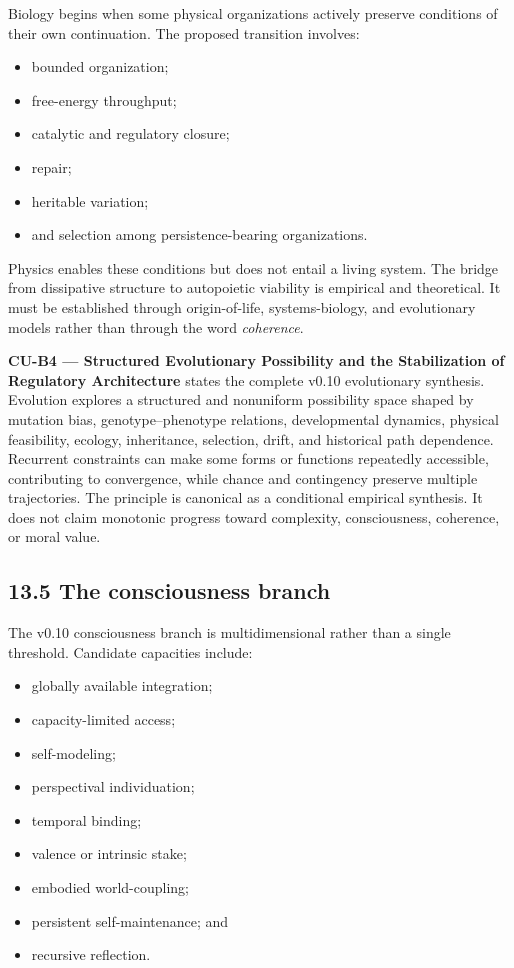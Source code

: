 \documentclass[
  11pt,
]{article}
\providecommand{\tightlist}{%
  \setlength{\itemsep}{0pt}\setlength{\parskip}{0pt}}
\begin{document}
Biology begins when some physical organizations actively preserve
conditions of their own continuation. The proposed transition involves:

\begin{itemize}
\tightlist
\item
  bounded organization;
\item
  free-energy throughput;
\item
  catalytic and regulatory closure;
\item
  repair;
\item
  heritable variation;
\item
  and selection among persistence-bearing organizations.
\end{itemize}

Physics enables these conditions but does not entail a living system.
The bridge from dissipative structure to autopoietic viability is
empirical and theoretical. It must be established through
origin-of-life, systems-biology, and evolutionary models rather than
through the word \emph{coherence}.

\textbf{CU-B4 --- Structured Evolutionary Possibility and the
Stabilization of Regulatory Architecture} states the complete v0.10
evolutionary synthesis. Evolution explores a structured and nonuniform
possibility space shaped by mutation bias, genotype--phenotype
relations, developmental dynamics, physical feasibility, ecology,
inheritance, selection, drift, and historical path dependence. Recurrent
constraints can make some forms or functions repeatedly accessible,
contributing to convergence, while chance and contingency preserve
multiple trajectories. The principle is canonical as a conditional
empirical synthesis. It does not claim monotonic progress toward
complexity, consciousness, coherence, or moral value.

\subsection{13.5 The consciousness
branch}\label{the-consciousness-branch}

The v0.10 consciousness branch is multidimensional rather than a single
threshold. Candidate capacities include:

\begin{itemize}
\tightlist
\item
  globally available integration;
\item
  capacity-limited access;
\item
  self-modeling;
\item
  perspectival individuation;
\item
  temporal binding;
\item
  valence or intrinsic stake;
\item
  embodied world-coupling;
\item
  persistent self-maintenance; and
\item
  recursive reflection.
\end{itemize}
\end{document}
